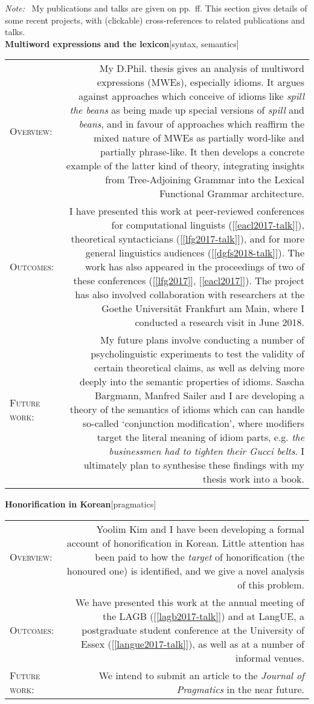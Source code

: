 \documentclass[11pt,a4paper,twoside]{article}
\makeatletter
\newlength{\rulelength}%
\newcommand{\REx}[2]{%
\vspace*{0.1\baselineskip}%
{\large\textbf{#1}\hfill\textnormal{[#2]}}%
\vspace*{0.5\baselineskip}%
}
\newenvironment{cvsection}{%
  \setlength{\extrarowheight}{0.70ex}
  \begin{longtable}[l]{@{} L R @{}}
}{%
  \end{longtable}
}
\newcommand{\sref}[1]{[\ref{#1}]}
\newcommand{\note}{\emph{Note: }}
\newcommand{\subhead}[1]{%
\textsc{#1}:%
}
\makeatother
\begin{document}
\note\ My publications and talks are given on pp.~\pageref{scholarship}ff. This section gives details of some recent projects, with (clickable) cross-references to related publications and talks.\\

\REx{Multiword expressions and the lexicon}{syntax, semantics}
\begin{cvsection}
  \subhead{Overview} &%
  My D.Phil. thesis gives an analysis of multiword expressions (MWEs), especially idioms. It argues against approaches which conceive of idioms like \emph{spill the beans} as being made up special versions of \emph{spill} and \emph{beans}, and in favour of approaches which reaffirm the mixed nature of MWEs as partially word-like and partially phrase-like. It then develops a concrete example of the latter kind of theory, integrating insights from Tree-Adjoining Grammar into the Lexical Functional Grammar architecture.%
\\
  \subhead{Outcomes} &%
  I have presented this work at peer-reviewed conferences for computational linguists (\sref{eacl2017-talk}), theoretical syntacticians (\sref{lfg2017-talk}), and for more general linguistics audiences (\sref{dgfs2018-talk}). The work has also appeared in the proceedings of two of these conferences (\sref{lfg2017}, \sref{eacl2017}).
  The project has also involved collaboration with researchers at the Goethe Universit\"{a}t Frankfurt am Main, where I conducted a research visit in June 2018.
\\
  \subhead{Future work} &%
  My future plans involve conducting a number of psycholinguistic experiments to test the validity of certain theoretical claims, as well as delving more deeply into the semantic properties of idioms. Sascha Bargmann, Manfred Sailer and I are developing a theory of the semantics of idioms which can can handle so-called `conjunction modification', where modifiers target the literal meaning of idiom parts, e.g. \textit{the businessmen had to tighten their Gucci belts}. I ultimately plan to synthesise these findings with my thesis work into a book.
\end{cvsection}

\REx{Honorification in Korean}{pragmatics}
\begin{cvsection}
  \subhead{Overview} &%
  Yoolim Kim and I have been developing a formal account of honorification in Korean. Little attention has been paid to how the \emph{target} of honorification (the honoured one) is identified, and we give a novel analysis of this problem.%
\\
  \subhead{Outcomes} &%
  We have presented this work at the annual meeting of the LAGB (\sref{lagb2017-talk}) and at LangUE, a postgraduate student conference at the University of Essex (\sref{langue2017-talk}), as well as at a number of informal venues.%
\\
  \subhead{Future work} &%
  We intend to submit an article to the \textit{Journal of Pragmatics} in the near future.
\end{cvsection}
\end{document}
